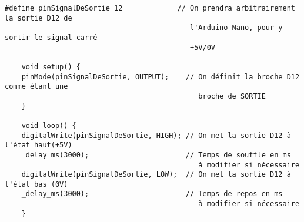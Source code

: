 \begin{verbatim}
#define pinSignalDeSortie 12             // On prendra arbitrairement la sortie D12 de 
                                            l'Arduino Nano, pour y sortir le signal carré 
                                            +5V/0V

    void setup() {
    pinMode(pinSignalDeSortie, OUTPUT);    // On définit la broche D12 comme étant une 
                                              broche de SORTIE
    }

    void loop() {
    digitalWrite(pinSignalDeSortie, HIGH); // On met la sortie D12 à l'état haut(+5V)
    _delay_ms(3000);                       // Temps de souffle en ms 
                                              à modifier si nécessaire
    digitalWrite(pinSignalDeSortie, LOW);  // On met la sortie D12 à l'état bas (0V)
    _delay_ms(3000);                       // Temps de repos en ms 
                                              à modifier si nécessaire
    }
\end{verbatim}